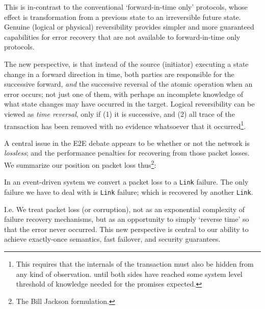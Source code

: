 \documentclass[../../../OAE-SPEC-MAIN.tex]{subfiles}
\begin{document}
This is in-contrast to the conventional `forward-in-time only' protocols, whose effect is transformation from a previous state to an irreversible future state. Genuine (logical or physical) reversibility provides simpler and more guaranteed capabilities for error recovery that are not available to forward-in-time only protocols.

The new perspective, is that instead of the source (initiator) executing a state change in a forward direction in time, both parties are responsible for the successive forward, \emph{and} the successive reversal of the atomic operation when an error occurs; not just one of them, with perhaps an incomplete knowledge of what state changes may have occurred in the target. Logical reversibility can be viewed as \emph{time reversal}, only if (1) it is successive, and (2) all trace of the transaction has been removed with no evidence whatsoever that it occurred\footnote{This requires that the internals of the transaction must also be hidden from any kind of observation. until both sides have reached some system level threshold of knowledge needed for the promises expected.}.

A central issue in the E2E debate appears to be whether or not the network is \emph{lossless}; and the performance penalties for recovering from those packet losses. 
We summarize our position on packet loss thus\footnote{The Bill Jackson formulation.}:
\begin{highlightbox}
\noindent In an event-driven system we convert a packet loss to a \texttt{Link} failure. The only failure we have to deal with is \texttt{Link}  failure; which is  recovered by another \texttt{Link}. %
\end{highlightbox}

I.e. We treat packet loss (or corruption), not as an exponential complexity of failure recovery mechanisms, but as an opportunity to simply `reverse time' so that the error never occurred.  This new perspective is central to our ability to achieve exactly-once semantics, fast failover, and security guarantees.
\end{document}
